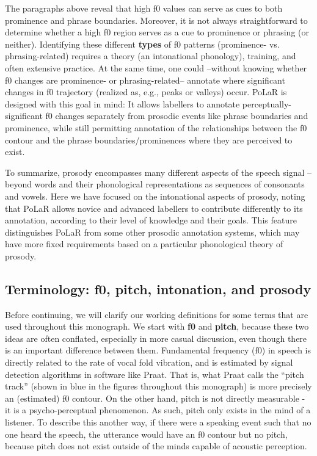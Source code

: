 \documentclass[11pt, twoside]{memoir}
\begin{document}
The paragraphs above reveal that high f0 values can serve as cues to both prominence and phrase boundaries. Moreover, it is not always straightforward to determine whether a high f0 region serves as a cue to prominence or phrasing (or neither). Identifying these different \textbf{types} of f0 patterns (prominence- vs. phrasing-related) requires a theory (an intonational phonology), training, and often extensive practice. At the same time, one could --without knowing whether f0 changes are prominence- or phrasing-related-- annotate where significant changes in f0 trajectory (realized as, e.g., peaks or valleys) occur. PoLaR is designed with this goal in mind: It allows labellers to annotate perceptually-significant f0 changes separately from prosodic events like phrase boundaries and prominence, while still permitting annotation of the relationships between the f0 contour and the phrase boundaries\slash prominences where they are perceived to exist.

To summarize, prosody encompasses many different aspects of the speech signal -- beyond words and their phonological representations as sequences of consonants and vowels. Here we have focused on the intonational aspects of prosody, noting that PoLaR allows novice and advanced labellers to contribute differently to its annotation, according to their level of knowledge and their goals. This feature distinguishes PoLaR from some other prosodic annotation systems, which may have more fixed requirements based on a particular phonological theory of prosody.

\subsection{Terminology: f0, pitch, intonation, and prosody}\label{sec:terminology}

Before continuing, we will clarify our working definitions for some terms that are used throughout this monograph. We start with \textbf{f0} and \textbf{pitch}, because these two ideas are often conflated, especially in more casual discussion, even though there is an important difference between them. Fundamental frequency (f0) in speech is directly related to the rate of vocal fold vibration, and is estimated by signal detection algorithms in software like Praat. That is, what Praat calls the “pitch track” (shown in blue in the figures throughout this monograph) is more precisely an (estimated) f0 contour. On the other hand, pitch is not directly measurable - it is a psycho-perceptual phenomenon. As such, pitch only exists in the mind of a listener. To describe this another way, if there were a speaking event such that no one heard the speech, the utterance would have an f0 contour but no pitch, because pitch does not exist outside of the minds capable of acoustic perception.
\end{document}
